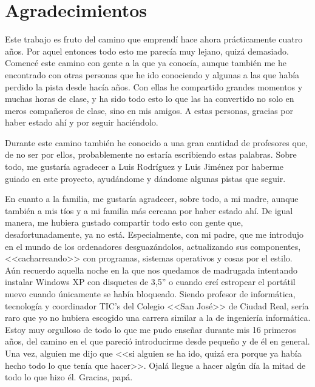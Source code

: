 \chapter{Agradecimientos}

Este trabajo es fruto del camino que emprendí hace ahora prácticamente cuatro años. Por aquel entonces todo esto me parecía muy lejano, quizá demasiado. Comencé este camino con gente a la que ya conocía, aunque también me he encontrado con otras personas que he ido conociendo y algunas a las que había perdido la pista desde hacía años. Con ellas he compartido grandes momentos y muchas horas de clase, y ha sido todo esto lo que las ha convertido no solo en meros compañeros de clase, sino en mis amigos. A estas personas, gracias por haber estado ahí y por seguir haciéndolo.

Durante este camino también he conocido a una gran cantidad de profesores que, de no ser por ellos, probablemente no estaría escribiendo estas palabras. Sobre todo, me gustaría agradecer a Luis Rodríguez y Luis Jiménez por haberme guiado en este proyecto, ayudándome y dándome algunas pistas que seguir.

En cuanto a la familia, me gustaría agradecer, sobre todo, a mi madre, aunque también a mis tíos y a mi familia más cercana por haber estado ahí. De igual manera, me hubiera gustado compartir todo esto con gente que, desafortunadamente, ya no está. Especialmente, con mi padre, que me introdujo en el mundo de los ordenadores desguazándolos, actualizando sus componentes, <<cacharreando>> con programas, sistemas operativos y cosas por el estilo. Aún recuerdo aquella noche en la que nos quedamos de madrugada intentando instalar \mbox{Windows} XP con disquetes de 3,5'' o cuando creí estropear el portátil nuevo cuando únicamente se había bloqueado. Siendo profesor de informática, tecnología y coordinador TIC's del Colegio <<San José>> de Ciudad Real, sería raro que yo no hubiera escogido una carrera similar a la de ingeniería informática. Estoy muy orgulloso de todo lo que me pudo enseñar durante mis 16 primeros años, del camino en el que pareció introducirme desde pequeño y de él en general. Una vez, alguien me dijo que <<si alguien se ha ido, quizá era porque ya había hecho todo lo que tenía que hacer>>. Ojalá llegue a hacer algún día la mitad de todo lo que hizo él. \linebreak Gracias, papá. 

